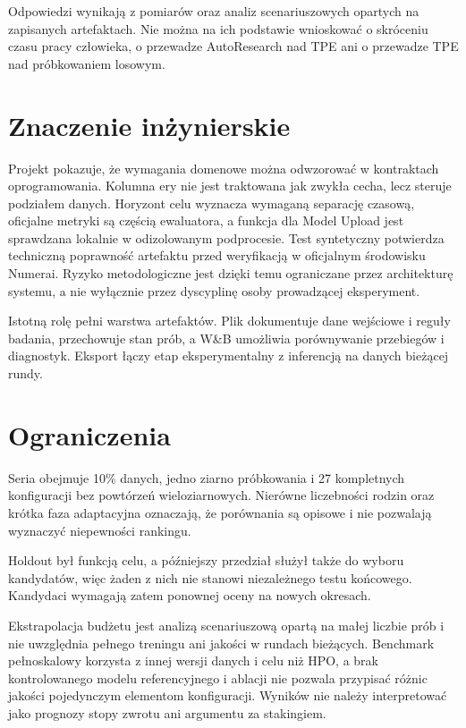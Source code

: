 Odpowiedzi wynikają z pomiarów oraz analiz scenariuszowych opartych na zapisanych
artefaktach. Nie można na ich podstawie wnioskować o skróceniu czasu pracy
człowieka, o przewadze AutoResearch nad TPE ani o przewadze TPE nad próbkowaniem
losowym.

\section{Znaczenie inżynierskie}
Projekt pokazuje, że wymagania domenowe można odwzorować w kontraktach
oprogramowania. Kolumna ery nie jest traktowana jak zwykła cecha, lecz steruje
podziałem danych. Horyzont celu wyznacza wymaganą separację czasową, oficjalne
metryki są częścią ewaluatora, a funkcja  dla Model Upload jest
sprawdzana lokalnie w odizolowanym podprocesie. Test syntetyczny potwierdza
techniczną poprawność artefaktu przed weryfikacją w oficjalnym środowisku Numerai.
Ryzyko metodologiczne jest dzięki temu ograniczane przez architekturę systemu,
a nie wyłącznie przez dyscyplinę osoby prowadzącej eksperyment.

Istotną rolę pełni warstwa artefaktów. Plik  dokumentuje
dane wejściowe i reguły badania,  przechowuje stan prób, a W\&B
umożliwia porównywanie przebiegów i diagnostyk. Eksport 
łączy etap eksperymentalny z inferencją na danych bieżącej rundy.

\section{Ograniczenia}
Seria obejmuje 10\% danych, jedno ziarno próbkowania i 27 kompletnych konfiguracji
bez powtórzeń wieloziarnowych. Nierówne liczebności rodzin oraz krótka faza
adaptacyjna oznaczają, że porównania są opisowe i nie pozwalają wyznaczyć
niepewności rankingu.

Holdout był funkcją celu, a późniejszy przedział służył także do wyboru
kandydatów, więc żaden z nich nie stanowi niezależnego testu końcowego. Kandydaci
wymagają zatem ponownej oceny na nowych okresach.

Ekstrapolacja budżetu jest analizą scenariuszową opartą na małej liczbie prób i
nie uwzględnia pełnego treningu ani jakości w rundach bieżących. Benchmark pełnoskalowy korzysta
z innej wersji danych i celu niż HPO, a brak kontrolowanego modelu referencyjnego i ablacji
nie pozwala przypisać różnic jakości pojedynczym elementom konfiguracji. Wyników
nie należy interpretować jako prognozy stopy zwrotu ani argumentu za stakingiem.

